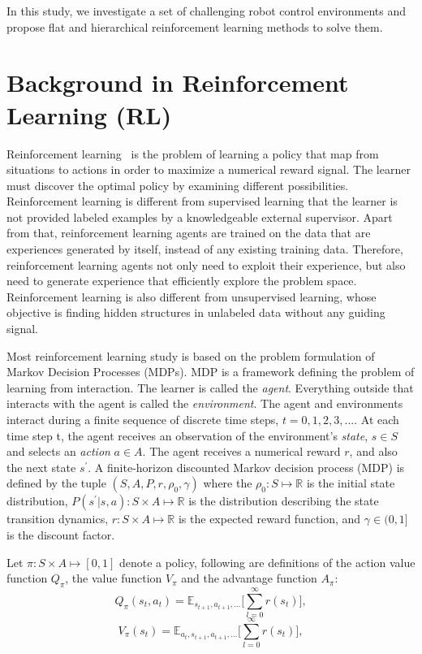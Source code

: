 In this study, we investigate a set of challenging robot control environments and propose flat and hierarchical reinforcement learning methods to solve them.
\section{Background in Reinforcement Learning (RL)}
Reinforcement learning~\cite{sutton1998reinforcement} is the problem of learning a policy that map from situations to actions in order to maximize a numerical reward signal. The learner must discover the optimal policy by examining different possibilities. Reinforcement learning is different from supervised learning that the learner is not provided labeled examples by a knowledgeable external supervisor. Apart from that, reinforcement learning agents are trained on the data that are experiences generated by itself, instead of any existing training data. Therefore, reinforcement learning agents not only need to exploit their experience, but also need to generate experience that efficiently explore the problem space.  Reinforcement learning is also different from unsupervised learning, whose objective is finding hidden structures in unlabeled data without any guiding signal.

Most reinforcement learning study is based on the problem formulation of Markov Decision Processes (MDPs). MDP is a framework defining the problem of learning from interaction. The learner is called the \textit{agent}. Everything outside that interacts with the agent is called the \textit{environment}.
The agent and environments interact during a finite sequence of discrete time steps, $t=0,1,2,3,...$. At each time step t, the agent receives an observation of the environment's \textit{state}, $s \in S$ and selects an \textit{action} $a \in A$. The agent receives a numerical reward $r$, and also the next state $s^\prime$.  A finite-horizon discounted Markov decision process (MDP) is defined by the tuple $(S,A,P,r,\rho_0,\gamma) $ where the $\rho_0 : S \mapsto \mathbb{R}$ is the initial state distribution, $P(s^\prime|s,a) : S \times A \mapsto \mathbb{R}$ is the distribution describing the state transition dynamics, $r : S \times A \mapsto \mathbb{R}$ is the expected reward function, and $\gamma \in (0,1]$ is the discount factor.

Let $\pi : S \times A \mapsto [0,1] $ denote a policy, following are definitions of the action value function $Q_\pi $, the value function $V_\pi $ and the advantage function $A_\pi $:
$$ Q_\pi(s_t,a_t) = \mathbb{E}_{s_{t+1},a_{t+1},\ldots}
\big[ \sum_{l=0}^\infty r(s_{t}) \big],$$
$$ V_\pi(s_t) = \mathbb{E}_{a_{t},s_{t+1},a_{t+1},\ldots}
\big[ \sum_{l=0}^\infty r(s_{t}) \big],$$

